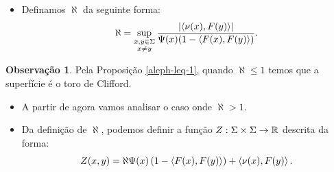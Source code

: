 \documentclass[10pt,a4paper]{beamer}
\theoremstyle{definition}
\newtheorem{observacao}{Observação}
\begin{document}
\begin{frame}
	
	\begin{itemize}
		\item Definamos $\aleph$ da seguinte forma:
		\begin{equation*}
		\aleph = \sup_{\substack{x,y \in \Sigma \\ x \neq y}} \frac{\left| \left\langle \nu(x),F(y) \right\rangle \right|}{\Psi(x) (1-\left\langle F(x),F(y) \right\rangle)}.
		\end{equation*}
	\end{itemize}
	
	\pause
	
	\begin{observacao}
		Pela Proposição \ref{aleph-leq-1}, quando $\aleph \leq 1$ temos que a superfície é o toro de Clifford. 
	\end{observacao}

	\pause

	\begin{itemize}
		\item A partir de agora vamos analisar o caso onde $\aleph > 1$.
		
		\pause
		
		\item 	Da definição de $\aleph$, podemos definir a função $Z: \Sigma \times \Sigma \rightarrow \mathbb R$ descrita da forma:
		\begin{equation*}
		Z(x,y) = \aleph \Psi(x) \left(1 - \left\langle F(x),F(y) \right\rangle \right) + \left\langle \nu(x),F(y) \right\rangle.
		\end{equation*}
		
		
	\end{itemize}

\end{frame}
	
\end{document}
